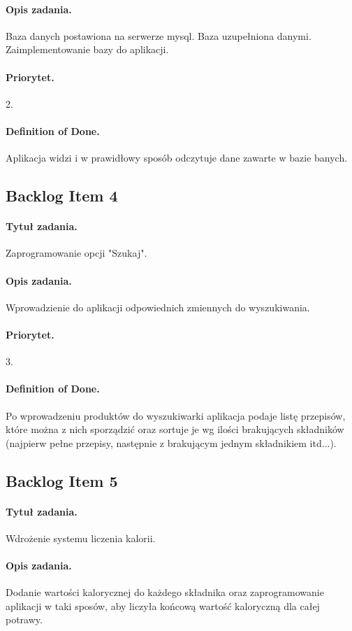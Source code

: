 \documentclass[a4paper]{article}
\begin{document}
\paragraph{Opis zadania.} Baza danych postawiona na serwerze mysql. Baza uzupełniona danymi. Zaimplementowanie bazy do aplikacji.
\paragraph{Priorytet.} 2.
\paragraph{Definition of Done.} Aplikacja widzi i w prawidłowy sposób odczytuje dane zawarte w bazie banych.

\subsection{Backlog Item 4}
\paragraph{Tytuł zadania.} Zaprogramowanie opcji "Szukaj".
\paragraph{Opis zadania.} Wprowadzienie do aplikacji odpowiednich zmiennych do wyszukiwania.
\paragraph{Priorytet.} 3.
\paragraph{Definition of Done.} Po wprowadzeniu produktów do wyszukiwarki aplikacja podaje listę przepisów, które można z nich sporządzić oraz sortuje je wg ilości brakujących składników (najpierw pełne przepisy, następnie z brakującym jednym składnikiem itd...).

\subsection{Backlog Item 5}
\paragraph{Tytuł zadania.} Wdrożenie systemu liczenia kalorii.
\paragraph{Opis zadania.} Dodanie wartości kalorycznej do każdego składnika oraz zaprogramowanie aplikacji w taki sposów, aby liczyła końcową wartość kaloryczną dla całej potrawy.
\end{document}
